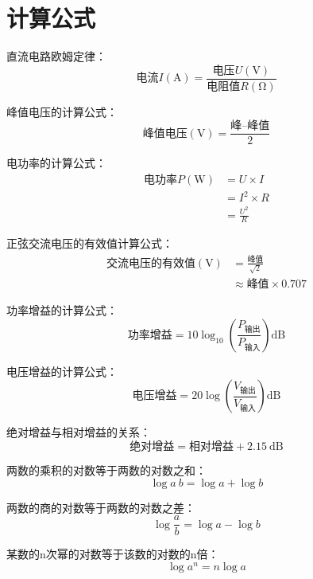 \newpage










\section{计算公式}

直流电路欧姆定律：
\[\mbox{电流}I(\si{\ampere})=\frac{\mbox{电压}U(\si{\volt})}{\mbox{电阻值}R(\si{\ohm})}\]

峰值电压的计算公式：
\[\mbox{峰值电压}(\si{\volt})=\frac{\mbox{峰--峰值}}{2}\]

电功率的计算公式：
\begin{equation*}
    \begin{aligned}
        \mbox{电功率}P(\si{\watt}) &= U\times I \\
        & = I^2 \times R \\
        & = \frac{U^2}{R}
    \end{aligned}
\end{equation*}

正弦交流电压的有效值计算公式：
\begin{equation*}
\begin{aligned}
\mbox{交流电压的有效值}(\si{\volt})&=\frac{\mbox{峰值}}{\sqrt{2}} \\
& \approx \mbox{峰值}\times 0.707
\end{aligned}
\end{equation*}

功率增益的计算公式：
\[\mbox{功率增益}=10 \log_{10} \left( {\frac{P_{ \mbox{输出} }}{P_{ \mbox{输入} }}}\right) \si{\dB}\]

电压增益的计算公式：
\[\mbox{电压增益}=20 \log \left( {\frac{V_{ \mbox{输出} }}{V_{ \mbox{输入} }}} \right) \si{\dB}\]


绝对增益与相对增益的关系：
\[\mbox{绝对增益} = \mbox{相对增益} + \SI{2.15}{\dB}\]

两数的乘积的对数等于两数的对数之和：
\[\log a\: b=\log a+\log b\]

两数的商的对数等于两数的对数之差：
\[\log\frac{a}{b}=\log a-\log b\]

某数的n次幂的对数等于该数的对数的n倍：
\[\log a^n =n\log a\]

\newpage








